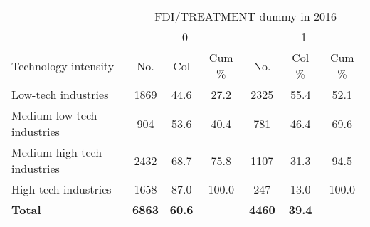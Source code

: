 \documentclass[]{article}
\begin{document}
\begin{tabular}{lcccccc} \hline
 & \multicolumn{6}{c}{FDI/TREATMENT dummy in 2016} \\
& \multicolumn{3}{c}{0} & \multicolumn{3}{c}{1} \\
Technology intensity &No.&Col &Cum \% &No.&Col \%&Cum \% \\
\hline
Low-tech industries&1869&44.6&27.2&2325&55.4&52.1 \\
Medium low-tech industries&904&53.6&40.4&781&46.4&69.6 \\
Medium high-tech industries&2432&68.7&75.8&1107&31.3&94.5 \\
High-tech industries&1658&87.0&100.0&247&13.0&100.0 \\
\textbf{Total}&\textbf{6863}&\textbf{60.6}&&\textbf{4460}&\textbf{39.4}& \\
\end{tabular}
\end{document}
